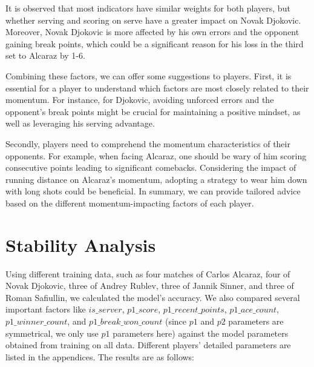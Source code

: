 \documentclass[UTF8]{ctexart} %
\begin{document}
It is observed that most indicators have similar weights for both players, but whether serving and scoring 
on serve have a greater impact on Novak Djokovic. Moreover, Novak Djokovic is more affected by his own 
errors and the opponent gaining break points, which could be a significant reason for his loss in the 
third set to Alcaraz by 1-6.

Combining these factors, we can offer some suggestions to players. First, it is essential for a player to 
understand which factors are most closely related to their momentum. For instance, for Djokovic, avoiding 
unforced errors and the opponent's break points might be crucial for maintaining a positive mindset, as 
well as leveraging his serving advantage.

Secondly, players need to comprehend the momentum characteristics of their opponents. For example, when 
facing Alcaraz, one should be wary of him scoring consecutive points leading to significant comebacks. 
Considering the impact of running distance on Alcaraz's momentum, adopting a strategy to wear him down 
with long shots could be beneficial. In summary, we can provide tailored advice based on the different 
momentum-impacting factors of each player.



\section{\textbf{Stability Analysis}}
Using different training data, such as four matches of Carlos Alcaraz, four of Novak Djokovic, three 
of Andrey Rublev, three of Jannik Sinner, and three of Roman Safiullin, we calculated the model's 
accuracy. We also compared several important factors like \(is\_server\), \(p1\_score\), 
\(p1\_recent\_points\), \(p1\_ace\_count\), \(p1\_winner\_count\), and \(p1\_break\_won\_count\) 
(since \(p1\) and \(p2\) parameters are symmetrical, we only use \(p1\) parameters here) against the 
model parameters obtained from training on all data. Different players' detailed parameters are listed in the appendices. The results are as follows:
\end{document}
